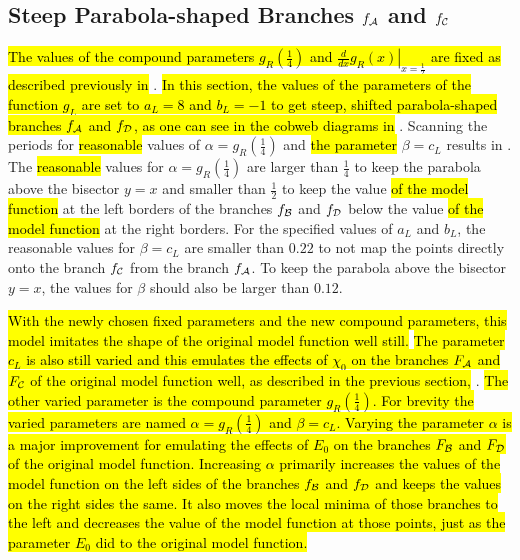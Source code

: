 \subsection{Steep Parabola-shaped Branches $f_{\mathcal{A}}$ and $f_{\mathcal{C}}$}
\label{sec:setup.quad.hyper.1}

\hl{The values of the compound parameters $g_R\left(\frac{1}{4}\right)$ and $\left. \frac{d}{dx} g_R\left(x\right) \right|_{x = \frac{1}{2}}$ are fixed as described previously in} .
\hl{In this section, the values of the parameters of the function $g_L$ are set to $a_L = 8$ and $b_L = -1$ to get steep, shifted parabola-shaped branches $f_{\mathcal{A}}$ and $f_{\mathcal{D}}$, as one can see in the cobweb diagrams in} .
Scanning the periods for \hl{reasonable} values of $\alpha = g_R\left(\frac{1}{4}\right)$ and \hl{the parameter} $\beta = c_L$ results in .
The \hl{reasonable} values for $\alpha = g_R\left(\frac{1}{4}\right)$ are larger than $\frac{1}{4}$ to keep the parabola above the bisector $y = x$ and smaller than $\frac{1}{2}$ to keep the value \hl{of the model function} at the left borders of the branches $f_{\mathcal{B}}$ and $f_{\mathcal{D}}$ below the value \hl{of the model function} at the right borders.
For the specified values of $a_L$ and $b_L$, the reasonable values for $\beta = c_L$ are smaller than $0.22$ to not map the points directly onto the branch $f_{\mathcal{C}}$ from the branch $f_{\mathcal{A}}$.
To keep the parabola above the bisector $y = x$, the values for $\beta$ should also be larger than $0.12$.

\hl{
	With the newly chosen fixed parameters and the new compound parameters, this model imitates the shape of the original model function well still.
}
\hl{The parameter $c_L$ is also still varied and this emulates the effects of $\chi_0$ on the branches $F_{\mathcal{A}}$ and $F_{\mathcal{C}}$ of the original model function well, as described in the previous section,} .
\hl{
	The other varied parameter is the compound parameter $g_R\left(\frac{1}{4}\right)$.
	For brevity the varied parameters are named $\alpha = g_R\left(\frac{1}{4}\right)$ and $\beta = c_L$.
	Varying the parameter $\alpha$ is a major improvement for emulating the effects of $E_0$ on the branches $F_{\mathcal{B}}$ and $F_{\mathcal{D}}$ of the original model function.
	Increasing $\alpha$ primarily increases the values of the model function on the left sides of the branches $f_{\mathcal{B}}$ and $f_{\mathcal{D}}$ and keeps the values on the right sides the same.
	It also moves the local minima of those branches to the left and decreases the value of the model function at those points, just as the parameter $E_0$ did to the original model function.
}

